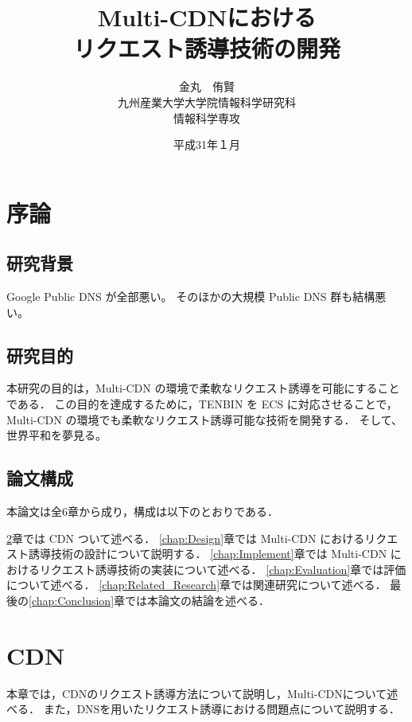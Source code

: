 \documentclass[a4j,12pt,onecolumn,oneside,titlepage,openany,final]{jreport}
\title{
 \Huge{Multi-CDNにおける}\\
 \Huge{リクエスト誘導技術の開発}
 \vspace{5.5cm}\\
}
\author{\LARGE{金丸　侑賢}\vspace{2cm}\\
\LARGE{九州産業大学大学院情報科学研究科}\vspace{0.5cm}\\
\LARGE{情報科学専攻}\vspace{1cm}\\
}
\date{\LARGE{平成31年１月}}
\begin{document}
\maketitle
\tableofcontents
\listoffigures
\listoftables

\chapter{序論}\label{chap:Prologue}

\section{研究背景}
Google Public DNS が全部悪い。
そのほかの大規模 Public DNS 群も結構悪い。
 
\section{研究目的}
本研究の目的は，Multi-CDN の環境で柔軟なリクエスト誘導を可能にすることである．
この目的を達成するために，TENBIN を ECS に対応させることで，Multi-CDN の環境でも柔軟なリクエスト誘導可能な技術を開発する．
そして、世界平和を夢見る。

\section{論文構成}
 本論文は全6章から成り，構成は以下のとおりである．
   
 \ref{chap:CDN}章では CDN ついて述べる．
 \ref{chap:Design}章では Multi-CDN におけるリクエスト誘導技術の設計について説明する．
 \ref{chap:Implement}章では Multi-CDN におけるリクエスト誘導技術の実装について述べる．
 \ref{chap:Evaluation}章では評価について述べる．
 \ref{chap:Related_Research}章では関連研究について述べる．
 最後の\ref{chap:Conclusion}章では本論文の結論を述べる．


\chapter{CDN}\label{chap:CDN}
本章では，CDNのリクエスト誘導方法について説明し，Multi-CDNについて述べる．
また，DNSを用いたリクエスト誘導における問題点について説明する．
\end{document}
